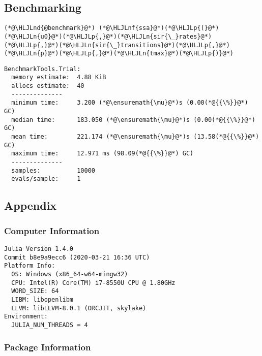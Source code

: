 \documentclass[12pt,a4paper]{article}
\newcommand{\HLJLn}[1]{#1}
\newcommand{\HLJLnd}[1]{\textcolor[RGB]{214,102,97}{#1}}
\newcommand{\HLJLnf}[1]{\textcolor[RGB]{66,102,213}{#1}}
\newcommand{\HLJLp}[1]{#1}
\begin{document}
\subsection{Benchmarking}

\begin{lstlisting}
(*@\HLJLnd{@benchmark}@*) (*@\HLJLnf{ssa}@*)(*@\HLJLp{(}@*)(*@\HLJLn{u0}@*)(*@\HLJLp{,}@*)(*@\HLJLn{sir{\_}rates}@*)(*@\HLJLp{,}@*)(*@\HLJLn{sir{\_}transitions}@*)(*@\HLJLp{,}@*)(*@\HLJLn{p}@*)(*@\HLJLp{,}@*)(*@\HLJLn{tmax}@*)(*@\HLJLp{)}@*)
\end{lstlisting}

\begin{lstlisting}
BenchmarkTools.Trial: 
  memory estimate:  4.88 KiB
  allocs estimate:  40
  --------------
  minimum time:     3.200 (*@\ensuremath{\mu}@*)s (0.00(*@{{\%}}@*) GC)
  median time:      183.050 (*@\ensuremath{\mu}@*)s (0.00(*@{{\%}}@*) GC)
  mean time:        221.174 (*@\ensuremath{\mu}@*)s (13.58(*@{{\%}}@*) GC)
  maximum time:     12.971 ms (98.09(*@{{\%}}@*) GC)
  --------------
  samples:          10000
  evals/sample:     1
\end{lstlisting}



\subsection{Appendix}

\subsubsection{Computer Information}

\begin{verbatim}
Julia Version 1.4.0
Commit b8e9a9ecc6 (2020-03-21 16:36 UTC)
Platform Info:
  OS: Windows (x86_64-w64-mingw32)
  CPU: Intel(R) Core(TM) i7-8550U CPU @ 1.80GHz
  WORD_SIZE: 64
  LIBM: libopenlibm
  LLVM: libLLVM-8.0.1 (ORCJIT, skylake)
Environment:
  JULIA_NUM_THREADS = 4

\end{verbatim}

\subsubsection{Package Information}
\end{document}
